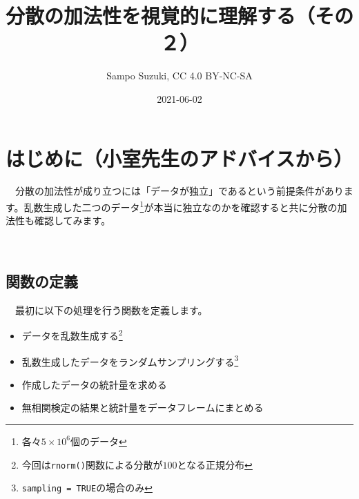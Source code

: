\documentclass[a4paper]{tufte-handout}
\title[分散の加法性を視覚的に理解する（その２）]{分散の加法性を視覚的に理解する（その２）}
\author{Sampo Suzuki, CC 4.0 BY-NC-SA}
\date{2021-06-02}
\providecommand{\tightlist}{%
  \setlength{\itemsep}{0pt}\setlength{\parskip}{0pt}}
\begin{document}
\maketitle




\hypertarget{ux306fux3058ux3081ux306bux5c0fux5ba4ux5148ux751fux306eux30a2ux30c9ux30d0ux30a4ux30b9ux304bux3089}{%
\section{\texorpdfstring{\textbf{はじめに}（小室先生のアドバイスから）}{はじめに（小室先生のアドバイスから）}}\label{ux306fux3058ux3081ux306bux5c0fux5ba4ux5148ux751fux306eux30a2ux30c9ux30d0ux30a4ux30b9ux304bux3089}}

　分散の加法性が成り立つには「データが独立」であるという前提条件があります。乱数生成した二つのデータ\footnote{各々\ensuremath{5\times 10^{6}}個のデータ}が本当に独立なのかを確認すると共に分散の加法性も確認してみます。

　

\hypertarget{ux95a2ux6570ux306eux5b9aux7fa9}{%
\subsection{\texorpdfstring{\textbf{関数の定義}}{関数の定義}}\label{ux95a2ux6570ux306eux5b9aux7fa9}}

　最初に以下の処理を行う関数を定義します。

\begin{itemize}
\tightlist
\item
  データを乱数生成する\footnote{今回は\texttt{rnorm()}関数による分散が\(100\)となる正規分布}
\item
  乱数生成したデータをランダムサンプリングする\footnote{\texttt{sampling\ =\ TRUE}の場合のみ}
\item
  作成したデータの統計量を求める
\item
  無相関検定の結果と統計量をデータフレームにまとめる
\end{itemize}
\end{document}
